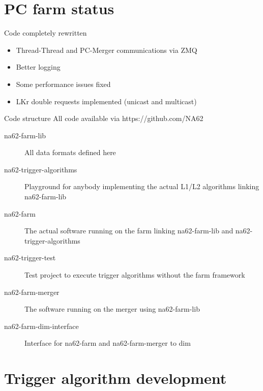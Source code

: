 \section*{PC farm status}

\begin{frame}{Code completely rewritten}{}
	\begin{itemize}
  		\item Thread-Thread and PC-Merger communications via ZMQ
  		\item Better logging
  		\item Some performance issues fixed
  		\item LKr double requests implemented (unicast and multicast)
  		 
	\end{itemize}
\end{frame}

\begin{frame}{Code structure}{}
	All code available via https://github.com/NA62
	
	\begin{description}
  		\item[na62-farm-lib] All data formats defined here

  		\item[na62-trigger-algorithms] Playground for anybody implementing the
  		actual L1/L2 algorithms linking na62-farm-lib

  		\item[na62-farm] The actual software running on the farm linking na62-farm-lib
  		and na62-trigger-algorithms
  		
	  	\item[na62-trigger-test] Test project to execute trigger algorithms without
	  	the farm framework

  		\item[na62-farm-merger] The software running on the merger using
  		na62-farm-lib

  		\item[na62-farm-dim-interface] Interface for na62-farm and na62-farm-merger
  		to dim
  		 
	\end{description}
\end{frame}

\section*{Trigger algorithm development}

